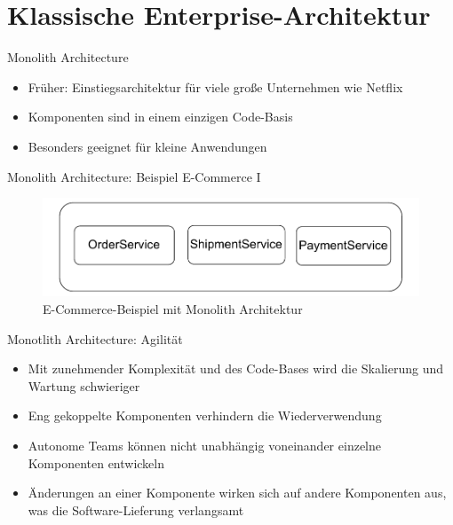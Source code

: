 \section{Klassische Enterprise-Architektur}


\begin{frame}{Monolith Architecture}
    \begin{itemize}
        \item Früher: Einstiegsarchitektur für viele große Unternehmen wie Netflix
        \item Komponenten sind in einem einzigen Code-Basis
        \item Besonders geeignet für kleine Anwendungen
    \end{itemize}
\end{frame}

\begin{frame}{Monolith Architecture: Beispiel E-Commerce I}
    \begin{figure}[!h]
        \centering
        \includegraphics[scale=0.70]{imglib/mono/mono}
        \caption{E-Commerce-Beispiel mit Monolith Architektur}
        \label{fig:mono-ecommerce}
    \end{figure}
\end{frame}

\begin{frame}{Monotlith Architecture: Agilität}
    \begin{itemize}
        \item Mit zunehmender Komplexität und des Code-Bases wird die Skalierung und Wartung schwieriger
        \item Eng gekoppelte Komponenten verhindern die Wiederverwendung
        \item Autonome Teams können nicht unabhängig voneinander einzelne Komponenten entwickeln
        \item Änderungen an einer Komponente wirken sich auf andere Komponenten aus, was die Software-Lieferung verlangsamt
    \end{itemize}
\end{frame}

